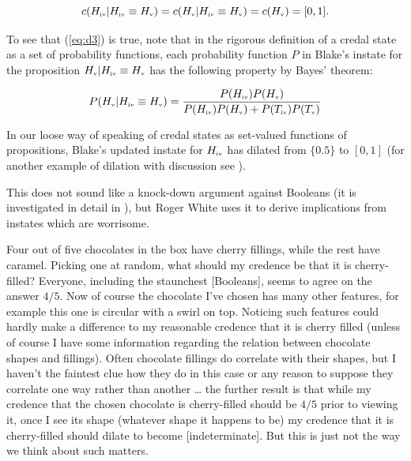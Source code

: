 \documentclass[phd,12pt,oneside]{ubcthesis}
\begin{document}
\begin{equation}
  \label{eq:d3}
  c(H_{\mbox{\tiny{iv}}}|H_{\mbox{\tiny{iv}}}\equiv{}H_{\mbox{\tiny{v}}})=c(H_{\mbox{\tiny{v}}}|H_{\mbox{\tiny{iv}}}\equiv{}H_{\mbox{\tiny{v}}})=c(H_{\mbox{\tiny{v}}})=[0,1].
\end{equation}

{\noindent}To see that (\ref{eq:d3}) is true, note that in the rigorous
definition of a credal state as a set of probability functions, each
probability function $P$ in Blake's instate for the proposition
$H_{\mbox{\tiny{v}}}|H_{\mbox{\tiny{iv}}}\equiv{}H_{\mbox{\tiny{v}}}$
has the following property by Bayes' theorem:

\begin{equation}
  \label{eq:zeibaefu}
  P(H_{\mbox{\tiny{v}}}|H_{\mbox{\tiny{iv}}}\equiv{}H_{\mbox{\tiny{v}}})=\frac{P(H_{\mbox{\tiny{iv}}})P(H_{\mbox{\tiny{v}}})}{P(H_{\mbox{\tiny{iv}}})P(H_{\mbox{\tiny{v}}})+P(T_{\mbox{\tiny{iv}}})P(T_{\mbox{\tiny{v}}})}
\end{equation}

{\noindent}In our loose way of speaking of credal states as set-valued functions
of propositions, Blake's updated instate for $H_{\mbox{\tiny{iv}}}$
has dilated from $\{0.5\}$ to $[0,1]$ (for another example of dilation
with discussion see ).

This does not sound like a knock-down argument against Booleans (it is
investigated in detail in ), but
Roger White uses it to derive implications from instates which are
worrisome.

\begin{quotex}
  \label{ex:chocolates} Four out of five
  chocolates in the box have cherry fillings, while the rest have
  caramel. Picking one at random, what should my credence be that it
  is cherry-filled? Everyone, including the staunchest [Booleans],
  seems to agree on the answer $4/5$. Now of course the chocolate I've
  chosen has many other features, for example this one is circular
  with a swirl on top. Noticing such features could hardly make a
  difference to my reasonable credence that it is cherry filled
  (unless of course I have some information regarding the relation
  between chocolate shapes and fillings). Often chocolate fillings do
  correlate with their shapes, but I haven't the faintest clue how
  they do in this case or any reason to suppose they correlate one way
  rather than another {\ldots} the further result is that while my
  credence that the chosen chocolate is cherry-filled should be $4/5$
  prior to viewing it, once I see its shape (whatever shape it happens
  to be) my credence that it is cherry-filled should dilate to become
  [indeterminate]. But this is just not the way we think about such
  matters. 
\end{quotex}
\end{document}
